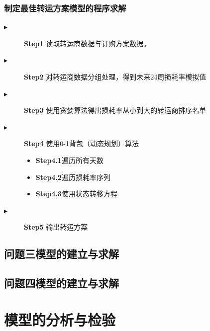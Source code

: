 \documentclass{cumcmthesis}
\begin{document}
\subsubsection*{制定最佳转运方案模型的程序求解}
\begin{description}
    \item[$\blacktriangleright$] \textbf{Step1} 读取转运商数据与订购方案数据。
    \item[$\blacktriangleright$] \textbf{Step2} 对转运商数据分组处理，得到未来24周损耗率模拟值
    \item[$\blacktriangleright$] \textbf{Step3} 使用贪婪算法得出损耗率从小到大的转运商排序名单
    \item[$\blacktriangleright$] \textbf{Step4} 使用0-1背包（动态规划）算法
        \begin{itemize}
            \item \textbf{Step4.1}遍历所有天数
            \item \textbf{Step4.2}遍历损耗率序列
            \item \textbf{Step4.3}使用状态转移方程
        \end{itemize}
    \item[$\blacktriangleright$] \textbf{Step5} 输出转运方案
\end{description}



\subsection{问题三模型的建立与求解}
\subsection{问题四模型的建立与求解}
\section{模型的分析与检验}
\end{document}

